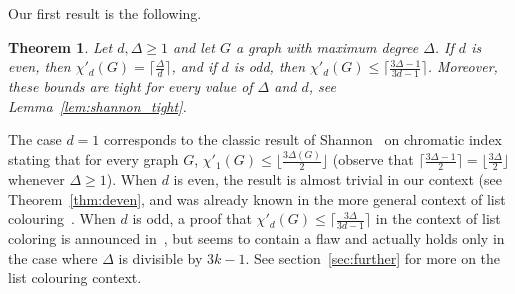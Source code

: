\documentclass[11pt]{article}
\newtheorem{theorem}[lemma]{Theorem}
\begin{document}





Our first result is the following.

\begin{theorem}\label{thm:main_theorem}
Let $d, \Delta \geq 1$ and let $G$ a graph with maximum degree $\Delta$. 
If $d$ is even, then $\chi'_{d}(G) = \lceil \frac{\Delta}{d} \rceil$, and if $d$ is odd, then $\chi'_{d}(G) \leq \lceil \frac{3\Delta - 1}{3d - 1} \rceil$. Moreover, these bounds are tight for every value  of $\Delta$ and $d$, see Lemma~\ref{lem:shannon_tight}.
\end{theorem}

The case $d=1$ corresponds to the classic result of Shannon~\cite{S49} on chromatic index  stating that for every graph $G$, $\chi'_1(G) \leq \lfloor \frac{3\Delta(G)}{2} \rfloor$ (observe that $\lceil \frac{3\Delta - 1}{2} \rceil = \lfloor \frac{3\Delta}{2} \rfloor$ whenever $\Delta \geq 1$). 
When $d$ is even, the result is almost trivial in our context (see Theorem~\ref{thm:deven}, and was already known in the more general context of list colouring~\cite{HILTON2001253, amini:inria-00144318}. 
When $d$ is odd, a proof that $\chi'_d(G) \leq \lceil \frac{3\Delta}{3d - 1} \rceil$ in the context of list coloring is announced in~\cite{amini:inria-00144318}, but seems to contain a flaw and actually holds only in the case where $\Delta$ is divisible by $3k-1$. See section~\ref{sec:further} for more on the list colouring context. 
\end{document}
